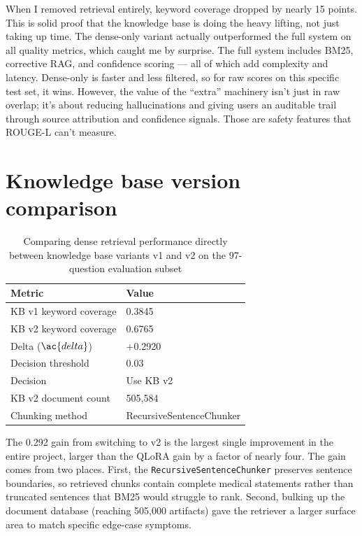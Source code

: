 When I removed retrieval entirely, keyword coverage dropped by nearly 15 points. This is solid proof that the knowledge base is doing the heavy lifting, not just taking up time. The dense-only variant actually outperformed the full system on all quality metrics, which caught me by surprise. The full system includes BM25, corrective RAG, and confidence scoring --- all of which add complexity and latency. Dense-only is faster and less filtered, so for raw scores on this specific test set, it wins. However, the value of the ``extra'' machinery isn't just in raw overlap; it's about reducing hallucinations and giving users an auditable trail through source attribution and confidence signals. Those are safety features that ROUGE-L can't measure.

\section{Knowledge base version comparison}

\begin{table}[htbp]
\centering
\caption{Comparing dense retrieval performance directly between knowledge base variants v1 and v2 on the 97-question evaluation subset}
\renewcommand{\arraystretch}{1.3}
\begin{tabular}{|l|l|}
\hline
\textbf{Metric} & \textbf{Value} \\
\hline
KB v1 keyword coverage & 0.3845 \\
KB v2 keyword coverage & 0.6765 \\
Delta ($\ac{delta}$) & +0.2920 \\
Decision threshold & 0.03 \\
Decision & Use KB v2 \\
KB v2 document count & 505,584 \\
Chunking method & RecursiveSentenceChunker \\
\hline
\end{tabular}
\end{table}

The 0.292 gain from switching to v2 is the largest single improvement in the entire project, larger than the QLoRA gain by a factor of nearly four. The gain comes from two places. First, the \texttt{RecursiveSentenceChunker} preserves sentence boundaries, so retrieved chunks contain complete medical statements rather than truncated sentences that BM25 would struggle to rank. Second, bulking up the document database (reaching 505,000 artifacts) gave the retriever a larger surface area to match specific edge-case symptoms.

